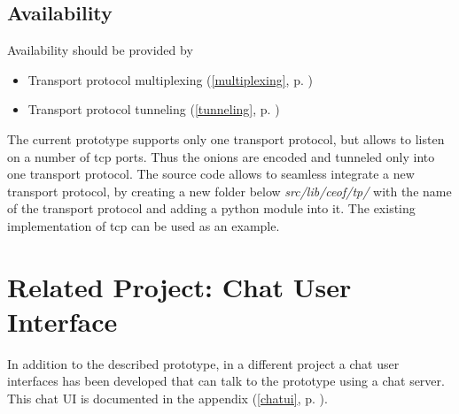 \subsection{Availability}
Availability should be provided by
\begin{itemize}
\item Transport protocol multiplexing (\ref{multiplexing}, p. \pageref{multiplexing})
\item Transport protocol tunneling (\ref{tunneling}, p. \pageref{tunneling})
\end{itemize}
The current prototype supports only one transport protocol, but allows to listen on
a number of tcp ports. Thus the onions are encoded and tunneled only into
one transport protocol. The source code allows to seamless integrate a new
transport protocol, by creating a new folder below
\textit{src/lib/ceof/tp/} with the name of the transport protocol and adding
a python module into it. The existing implementation of tcp can be used
as an example.
\section{Related Project: Chat User Interface}
In addition to the described prototype, in a different
project a chat user interfaces has been
developed that can talk to the prototype using a chat server.
This chat UI is documented in the appendix (\ref{chatui}, p. \pageref{chatui}).
